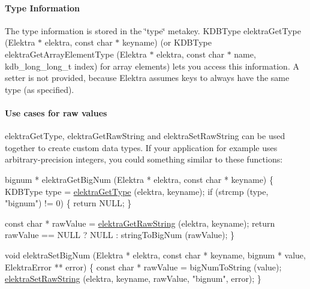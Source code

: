 \paragraph*{Type Information}

The type information is stored in the {\ttfamily \char`\"{}type\char`\"{}} metakey. {\ttfamily K\+D\+B\+Type elektra\+Get\+Type (Elektra $\ast$ elektra, const char $\ast$ keyname)} (or {\ttfamily K\+D\+B\+Type elektra\+Get\+Array\+Element\+Type (Elektra $\ast$ elektra, const char $\ast$ name, kdb\+\_\+long\+\_\+long\+\_\+t index)} for array elements) lets you access this information. A setter is not provided, because Elektra assumes keys to always have the same type (as specified).

\paragraph*{Use cases for raw values}

{\ttfamily elektra\+Get\+Type}, {\ttfamily elektra\+Get\+Raw\+String} and {\ttfamily elektra\+Set\+Raw\+String} can be used together to create custom data types. If your application for example uses arbitrary-\/precision integers, you could something similar to these functions\+:


\begin{DoxyCode}
bignum * elektraGetBigNum (Elektra * elektra, \textcolor{keyword}{const} \textcolor{keywordtype}{char} * keyname)
\{
  KDBType type = \hyperlink{group__highlevel_ga34afc074c83cf9ccd0a183573f8498a1}{elektraGetType} (elektra, keyname);
  \textcolor{keywordflow}{if} (strcmp (type, \textcolor{stringliteral}{"bignum"}) != 0)
  \{
    \textcolor{keywordflow}{return} NULL;
  \}

  \textcolor{keyword}{const} \textcolor{keywordtype}{char} * rawValue = \hyperlink{group__highlevel_gae6c8eff14fb431cce5afb405fa2511e3}{elektraGetRawString} (elektra, keyname);
  \textcolor{keywordflow}{return} rawValue == NULL ? NULL : stringToBigNum (rawValue);
\}

\textcolor{keywordtype}{void} elektraSetBigNum (Elektra * elektra, \textcolor{keyword}{const} \textcolor{keywordtype}{char} * keyname, bignum * value, ElektraError ** error)
\{
  \textcolor{keyword}{const} \textcolor{keywordtype}{char} * rawValue = bigNumToString (value);
  \hyperlink{group__highlevel_ga67d2f8d48b040d79c3d4a665c4f6410f}{elektraSetRawString} (elektra, keyname, rawValue, \textcolor{stringliteral}{"bignum"}, error);
\}
\end{DoxyCode}


